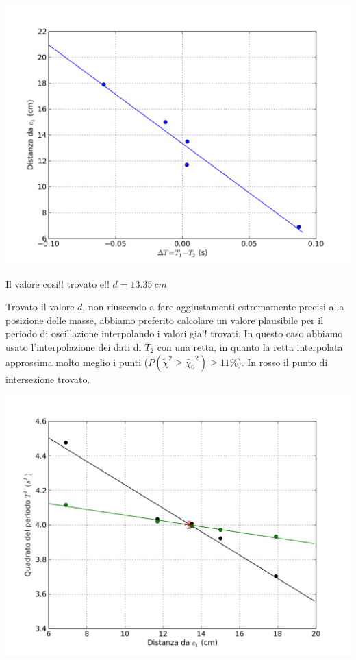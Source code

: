 \begin{center}
\includegraphics[scale=0.60]{../grafici/kater/intercetta.png}
\end{center}
Il valore cosi!! trovato e!! $d = 13.35\ cm$

Trovato il valore $d$, non riuscendo a fare aggiustamenti estremamente precisi alla posizione delle masse, abbiamo preferito calcolare un valore plausibile per il periodo di oscillazione interpolando i valori gia!! trovati. In questo caso abbiamo usato l'interpolazione dei dati di $T_2$ con una retta, in quanto la retta interpolata approssima molto meglio i punti ($P(\tilde{\chi}^2 \geq \tilde{\chi_0}^2) \geq 11\%$). In rosso il punto di intersezione trovato.

\begin{center}
\includegraphics[scale=0.70]{../grafici/kater/intersezione.png}
\end{center}


